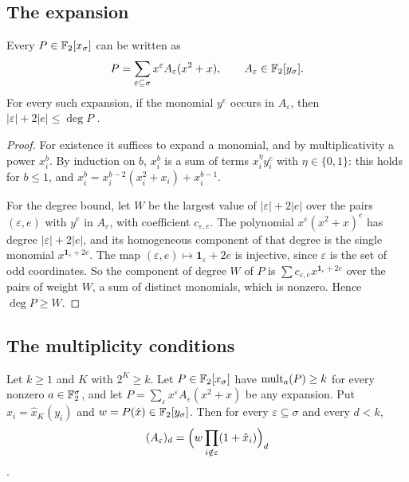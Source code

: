 \subsection{The expansion}

\begin{lemma}[Expansion]\label{lem:expansion}
Every \(P\in\mathbb F_2[x_\sigma]\) can be written as
\[
 P=\sum_{\varepsilon\subseteq\sigma}x^\varepsilon A_\varepsilon(x^2+x),\qquad
 A_\varepsilon\in\mathbb F_2[y_\sigma].
\]
For every such expansion, if the monomial \(y^e\) occurs in \(A_\varepsilon\), then
\(|\varepsilon|+2|e|\le\deg P\) .
\end{lemma}

\begin{proof}
For existence it suffices to expand a monomial, and by multiplicativity a power
\(x_i^b\). By induction on \(b\), \(x_i^b\) is a sum of terms \(x_i^\eta y_i^c\) with
\(\eta\in\{0,1\}\): this holds for \(b\le1\), and
\(x_i^b=x_i^{b-2}(x_i^2+x_i)+x_i^{b-1}\).

For the degree bound, let \(W\) be the largest value of \(|\varepsilon|+2|e|\) over
the pairs \((\varepsilon,e)\) with \(y^e\) in \(A_\varepsilon\), with coefficient
\(c_{\varepsilon,e}\). The polynomial \(x^\varepsilon(x^2+x)^e\) has degree
\(|\varepsilon|+2|e|\), and its homogeneous component of that degree is the single
monomial \(x^{\mathbf 1_\varepsilon+2e}\). The map \((\varepsilon,e)\mapsto\mathbf
1_\varepsilon+2e\) is injective, since \(\varepsilon\) is the set of odd
coordinates. So the component of degree \(W\) of \(P\) is
\(\sum c_{\varepsilon,e}x^{\mathbf 1_\varepsilon+2e}\) over the pairs of weight
\(W\), a sum of distinct monomials, which is nonzero. Hence \(\deg P\ge W\).
\end{proof}

\subsection{The multiplicity conditions}

\begin{lemma}[Congruence]\label{lem:congruence}
Let \(k\ge1\) and \(K\) with \(2^K\ge k\). Let \(P\in\mathbb F_2[x_\sigma]\) have
\(\operatorname{mult}_a(P)\ge k\) for every nonzero \(a\in\mathbb F_2^\sigma\), and let
\(P=\sum_\varepsilon x^\varepsilon A_\varepsilon(x^2+x)\) be any expansion. Put
\(\hat x_i=\hat x_K(y_i)\) and \(w=P(\hat x)\in\mathbb F_2[y_\sigma]\). Then for every
\(\varepsilon\subseteq\sigma\) and every \(d<k\),
\[
 (A_\varepsilon)_d=\Bigl(w\prod_{i\notin\varepsilon}(1+\hat x_i)\Bigr)_d
\]
.
\end{lemma}

